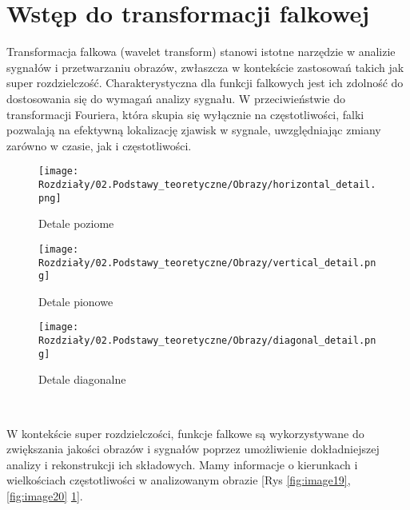 \section{Wstęp do transformacji falkowej}


Transformacja falkowa (wavelet transform) stanowi istotne narzędzie w analizie sygnałów i przetwarzaniu obrazów, zwłaszcza w kontekście zastosowań takich jak super rozdzielczość. Charakterystyczna dla funkcji falkowych jest ich zdolność do dostosowania się do wymagań analizy sygnału. W przeciwieństwie do transformacji Fouriera, która skupia się wyłącznie na częstotliwości, falki pozwalają na efektywną lokalizację zjawisk w sygnale, uwzględniając zmiany zarówno w czasie, jak i częstotliwości.

\begin{figure}[ht]
    \centering

    \begin{minipage}[t]{0.3\linewidth}
        \texttt{[image: Rozdziały/02.Podstawy\_teoretyczne/Obrazy/horizontal\_detail.png]}
        \caption{Detale poziome}
        \label{fig:image19}
    \end{minipage}
    \hspace{0.5cm}
    \begin{minipage}[t]{0.3\linewidth}
        \texttt{[image: Rozdziały/02.Podstawy\_teoretyczne/Obrazy/vertical\_detail.png]}
        \caption{Detale pionowe}
        \label{fig:image20}
    \end{minipage}
    \hspace{0.5cm}
    \begin{minipage}[t]{0.3\linewidth}
        \texttt{[image: Rozdziały/02.Podstawy\_teoretyczne/Obrazy/diagonal\_detail.png]}
        \caption{Detale diagonalne}
        \label{fig:image21}
    \end{minipage}
\end{figure}\

W kontekście super rozdzielczości, funkcje falkowe są wykorzystywane do zwiększania jakości obrazów i sygnałów poprzez umożliwienie dokładniejszej analizy i rekonstrukcji ich składowych. Mamy informacje o kierunkach i wielkościach częstotliwości w analizowanym obrazie [Rys \ref{fig:image19}, \ref{fig:image20} \ref{fig:image21}]. 

